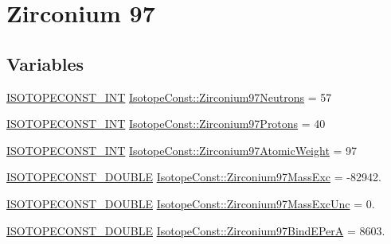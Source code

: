 \hypertarget{group___isotope_const-_zirconium-_zr97}{}\section{Zirconium 97}
\label{group___isotope_const-_zirconium-_zr97}
\subsection*{Variables}
\begin{DoxyCompactItemize}
\item 
\mbox{\hyperlink{group___isotope_const-_macros_ga5f18360b3e99483a35c32d789e62621c}{I\+S\+O\+T\+O\+P\+E\+C\+O\+N\+S\+T\+\_\+\+I\+NT}} \mbox{\hyperlink{group___isotope_const-_zirconium-_zr97_ga55ec069ea28eb5d3622a3d330e337ae0}{Isotope\+Const\+::\+Zirconium97\+Neutrons}} = 57
\item 
\mbox{\hyperlink{group___isotope_const-_macros_ga5f18360b3e99483a35c32d789e62621c}{I\+S\+O\+T\+O\+P\+E\+C\+O\+N\+S\+T\+\_\+\+I\+NT}} \mbox{\hyperlink{group___isotope_const-_zirconium-_zr97_gaa7949221ea86aa62b599b7daee0403a0}{Isotope\+Const\+::\+Zirconium97\+Protons}} = 40
\item 
\mbox{\hyperlink{group___isotope_const-_macros_ga5f18360b3e99483a35c32d789e62621c}{I\+S\+O\+T\+O\+P\+E\+C\+O\+N\+S\+T\+\_\+\+I\+NT}} \mbox{\hyperlink{group___isotope_const-_zirconium-_zr97_ga1f8bb1a8e64117d91d0b0f5e2495cdd6}{Isotope\+Const\+::\+Zirconium97\+Atomic\+Weight}} = 97
\item 
\mbox{\hyperlink{group___isotope_const-_macros_ga8f45a7272ce02c0b4c65c44636ed719a}{I\+S\+O\+T\+O\+P\+E\+C\+O\+N\+S\+T\+\_\+\+D\+O\+U\+B\+LE}} \mbox{\hyperlink{group___isotope_const-_zirconium-_zr97_ga675d88646a4971a68c91e6aed35cea1d}{Isotope\+Const\+::\+Zirconium97\+Mass\+Exc}} = -\/82942.
\item 
\mbox{\hyperlink{group___isotope_const-_macros_ga8f45a7272ce02c0b4c65c44636ed719a}{I\+S\+O\+T\+O\+P\+E\+C\+O\+N\+S\+T\+\_\+\+D\+O\+U\+B\+LE}} \mbox{\hyperlink{group___isotope_const-_zirconium-_zr97_ga919591194a68d86b9fdaf004ef0e08b3}{Isotope\+Const\+::\+Zirconium97\+Mass\+Exc\+Unc}} = 0.
\item 
\mbox{\hyperlink{group___isotope_const-_macros_ga8f45a7272ce02c0b4c65c44636ed719a}{I\+S\+O\+T\+O\+P\+E\+C\+O\+N\+S\+T\+\_\+\+D\+O\+U\+B\+LE}} \mbox{\hyperlink{group___isotope_const-_zirconium-_zr97_ga0c8da1eb2c12b4e65a66923116746c7b}{Isotope\+Const\+::\+Zirconium97\+Bind\+E\+PerA}} = 8603.
\item 

\end{DoxyCompactItemize}
